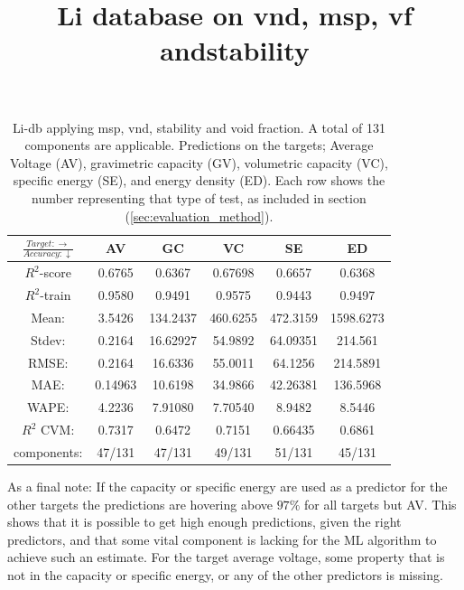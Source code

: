 \begin{table}[H]%
\scriptsize
\centering
\caption{Li-db applying msp, vnd, stability and void fraction. A total of 131 components are applicable. Predictions on the targets; Average Voltage (AV), gravimetric capacity (GV), volumetric capacity (VC), specific energy (SE), and energy density (ED). Each row shows the number representing that type of test, as included in section (\ref{sec:evaluation_method}).}
\title{Li database on vnd, msp, vf andstability}
\begin{tabular}{|c|c|c|c|c|c|}
	\hline 
	$\frac{Target: \rightarrow}{Accuracy:\downarrow} $ & AV & GC & VC & SE & ED 
	 \\ 
	\hline
	$R^2$-score 	& 0.6765 & 0.6367 & 0.67698 	& 0.6657 &  0.6368\\ 
	\hline 
	$R^2$-train 	& 0.9580 & 0.9491 & 0.9575 	&  0.9443 &  0.9497 \\ 
	\hline
	Mean: 	 	& 3.5426	&134.2437&460.6255& 472.3159& 1598.6273\\
	\hline 
	Stdev:	 	& 0.2164	&16.62927&54.9892	&64.09351	& 214.561\\
	\hline 
	RMSE: 		&0.2164& 16.6336 &  55.0011 	& 64.1256 &214.5891\\ 
	\hline
	MAE: 		& 0.14963 & 10.6198& 34.9866 & 42.26381 & 136.5968 \\ 
	\hline
	WAPE: 		& 4.2236 & 7.91080 & 7.70540  & 8.9482 & 8.5446 \\
	\hline
	$R^2$ CVM: 	& 0.7317 	& 0.6472 	& 0.7151	 &  0.66435 &0.6861 \\
	\hline
	components: 	& 47/131 	& 47/131 	& 49/131 	 & 51/131 	&45/131 \\
	\hline
\end{tabular}
\label{tab:Li-vnd-msp-vf-stability}
\end{table}

As a final note: If the capacity or specific energy are used as a predictor for the other targets the predictions are hovering above $97\%$ for all targets but AV. This shows that it is possible to get high enough predictions, given the right predictors, and that some vital component is lacking for the ML algorithm to achieve such an estimate. For the target average voltage, some property that is not in the capacity or specific energy, or any of the other predictors is missing. 



